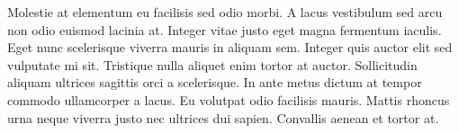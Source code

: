 Molestie at elementum eu facilisis sed odio morbi. A lacus vestibulum sed arcu non odio euismod lacinia at. Integer vitae justo eget magna fermentum iaculis. Eget nunc scelerisque viverra mauris in aliquam sem. Integer quis auctor elit sed vulputate mi sit. Tristique nulla aliquet enim tortor at auctor. Sollicitudin aliquam ultrices sagittis orci a scelerisque. In ante metus dictum at tempor commodo ullamcorper a lacus. Eu volutpat odio facilisis mauris. Mattis rhoncus urna neque viverra justo nec ultrices dui sapien. Convallis aenean et tortor at.